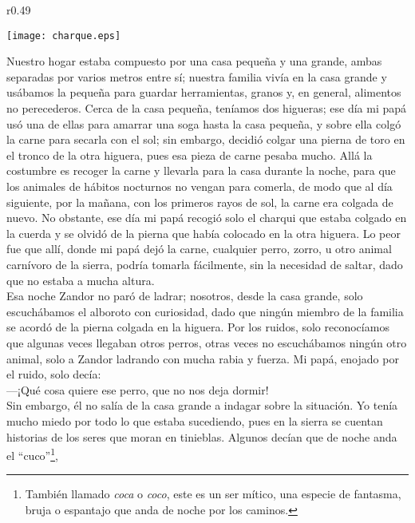 \ifdefined\EnableIncludeImages
\begin{wrapfigure}{r}{0.49\textwidth}
  \begin{center}
  \vspace{-20pt}
    \texttt{[image: charque.eps]}
  \end{center}
  \vspace{-20pt}
\end{wrapfigure}
\fi
Nuestro hogar estaba compuesto por una casa pequeña y una grande, ambas separadas por varios metros entre sí; nuestra familia vivía en la casa grande y usábamos la pequeña para guardar herramientas, granos y, en general, alimentos no perecederos.
Cerca de la casa pequeña, teníamos dos higueras; ese día mi papá usó una de ellas para amarrar una soga hasta la casa pequeña, y sobre ella colgó la carne para secarla con el sol; sin embargo, decidió colgar una pierna de toro en el tronco de la otra higuera, pues esa pieza de carne pesaba mucho.
Allá la costumbre es recoger la carne y llevarla para la casa durante la noche, para que los animales de hábitos nocturnos no vengan para comerla, de modo que al día siguiente, por la mañana, con los primeros rayos de sol, la carne era colgada de nuevo. 
No obstante, ese día mi papá recogió solo el charqui que estaba colgado en la cuerda y se olvidó de la pierna que había colocado en la otra higuera.
Lo peor fue que allí, donde mi papá dejó la carne, cualquier perro, zorro, u otro animal carnívoro de la sierra, podría tomarla fácilmente, sin la necesidad de saltar, dado que no estaba a mucha altura.\\\indent
Esa noche Zandor no paró de ladrar; nosotros, desde la casa grande, solo escuchábamos el alboroto con curiosidad, dado que ningún miembro de la familia se acordó de la pierna colgada en la higuera. 
Por los ruidos, solo reconocíamos que algunas veces llegaban otros perros, otras veces no escuchábamos ningún otro animal, solo a Zandor ladrando con mucha rabia y fuerza. 
Mi papá, enojado por el ruido, solo decía:\\\indent
---¡Qué cosa quiere ese perro, que no nos deja dormir!\\\indent
Sin embargo, él no salía de la casa grande a indagar sobre la situación. 
Yo tenía mucho miedo por todo lo que estaba sucediendo, pues en la sierra se cuentan historias de los seres que moran en tinieblas.
Algunos decían que de noche anda el ``cuco''\footnote{También llamado \textit{coca} o \textit{coco}, este es un ser mítico, una especie de fantasma, bruja o espantajo que anda de noche por los caminos.}, 
